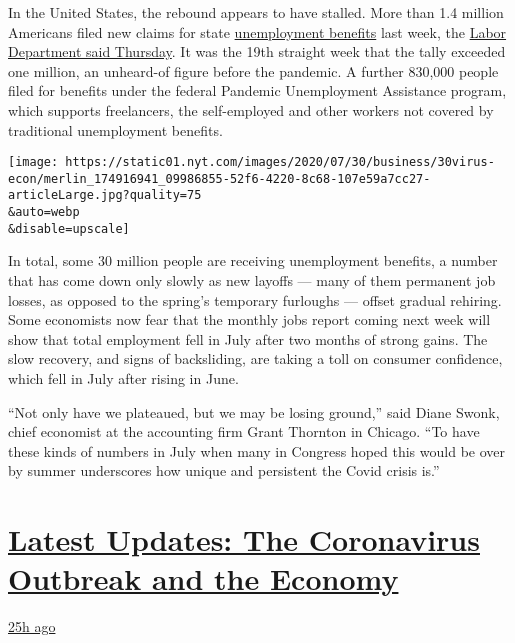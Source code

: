 In the United States, the rebound appears to have stalled. More than 1.4
million Americans filed new claims for state
\href{https://www.nytimes.com/2020/08/06/business/economy/unemployment-claims.html}{unemployment
benefits} last week, the
\href{https://oui.doleta.gov/press/2020/073020.pdf}{Labor Department
said Thursday}. It was the 19th straight week that the tally exceeded
one million, an unheard-of figure before the pandemic. A further 830,000
people filed for benefits under the federal Pandemic Unemployment
Assistance program, which supports freelancers, the self-employed and
other workers not covered by traditional unemployment benefits.

\texttt{[image: https://static01.nyt.com/images/2020/07/30/business/30virus-econ/merlin\_174916941\_09986855-52f6-4220-8c68-107e59a7cc27-articleLarge.jpg?quality=75\\\&auto=webp\\\&disable=upscale]}

In total, some 30 million people are receiving unemployment benefits, a
number that has come down only slowly as new layoffs --- many of them
permanent job losses, as opposed to the spring's temporary furloughs ---
offset gradual rehiring. Some economists now fear that the monthly jobs
report coming next week will show that total employment fell in July
after two months of strong gains. The slow recovery, and signs of
backsliding, are taking a toll on consumer confidence, which fell in
July after rising in June.

``Not only have we plateaued, but we may be losing ground,'' said Diane
Swonk, chief economist at the accounting firm Grant Thornton in Chicago.
``To have these kinds of numbers in July when many in Congress hoped
this would be over by summer underscores how unique and persistent the
Covid crisis is.''

\hypertarget{latest-updates-the-coronavirus-outbreak-and-the-economy}{%
\section{\texorpdfstring{\href{https://www.nytimes.com/live/2020/08/07/business/stock-market-today-coronavirus?action=click\&pgtype=Article\&state=default\&region=MAIN_CONTENT_1\&context=storylines_live_updates}{Latest
Updates: The Coronavirus Outbreak and the
Economy}}{Latest Updates: The Coronavirus Outbreak and the Economy}}\label{latest-updates-the-coronavirus-outbreak-and-the-economy}}

\href{https://www.nytimes.com/live/2020/08/07/business/stock-market-today-coronavirus?action=click\&pgtype=Article\&state=default\&region=MAIN_CONTENT_1\&context=storylines_live_updates\#wealthy-families-are-throwing-a-lifeline-to-distressed-businesses}{25h
ago}

